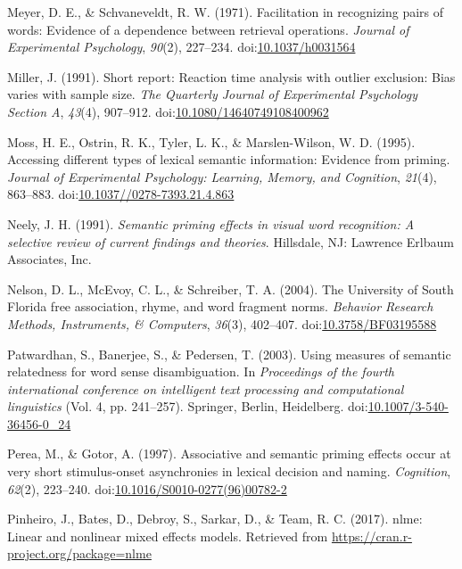 \documentclass[english,man]{apa6}
\theoremstyle{definition}
\theoremstyle{definition}
\theoremstyle{definition}
\theoremstyle{remark}
\begin{document}
\hypertarget{ref-Meyer1971}{}
Meyer, D. E., \& Schvaneveldt, R. W. (1971). Facilitation in recognizing
pairs of words: Evidence of a dependence between retrieval operations.
\emph{Journal of Experimental Psychology}, \emph{90}(2), 227--234.
doi:\href{https://doi.org/10.1037/h0031564}{10.1037/h0031564}

\hypertarget{ref-Miller1991}{}
Miller, J. (1991). Short report: Reaction time analysis with outlier
exclusion: Bias varies with sample size. \emph{The Quarterly Journal of
Experimental Psychology Section A}, \emph{43}(4), 907--912.
doi:\href{https://doi.org/10.1080/14640749108400962}{10.1080/14640749108400962}

\hypertarget{ref-Moss1995}{}
Moss, H. E., Ostrin, R. K., Tyler, L. K., \& Marslen-Wilson, W. D.
(1995). Accessing different types of lexical semantic information:
Evidence from priming. \emph{Journal of Experimental Psychology:
Learning, Memory, and Cognition}, \emph{21}(4), 863--883.
doi:\href{https://doi.org/10.1037//0278-7393.21.4.863}{10.1037//0278-7393.21.4.863}

\hypertarget{ref-Neely1991}{}
Neely, J. H. (1991). \emph{Semantic priming effects in visual word
recognition: A selective review of current findings and theories}.
Hillsdale, NJ: Lawrence Erlbaum Associates, Inc.

\hypertarget{ref-Nelson2004}{}
Nelson, D. L., McEvoy, C. L., \& Schreiber, T. A. (2004). The University
of South Florida free association, rhyme, and word fragment norms.
\emph{Behavior Research Methods, Instruments, \& Computers},
\emph{36}(3), 402--407.
doi:\href{https://doi.org/10.3758/BF03195588}{10.3758/BF03195588}

\hypertarget{ref-Patwardhan2003}{}
Patwardhan, S., Banerjee, S., \& Pedersen, T. (2003). Using measures of
semantic relatedness for word sense disambiguation. In \emph{Proceedings
of the fourth international conference on intelligent text processing
and computational linguistics} (Vol. 4, pp. 241--257). Springer, Berlin,
Heidelberg.
doi:\href{https://doi.org/10.1007/3-540-36456-0_24}{10.1007/3-540-36456-0\_24}

\hypertarget{ref-Perea1997}{}
Perea, M., \& Gotor, A. (1997). Associative and semantic priming effects
occur at very short stimulus-onset asynchronies in lexical decision and
naming. \emph{Cognition}, \emph{62}(2), 223--240.
doi:\href{https://doi.org/10.1016/S0010-0277(96)00782-2}{10.1016/S0010-0277(96)00782-2}

\hypertarget{ref-Pinheiro2017}{}
Pinheiro, J., Bates, D., Debroy, S., Sarkar, D., \& Team, R. C. (2017).
nlme: Linear and nonlinear mixed effects models. Retrieved from
\url{https://cran.r-project.org/package=nlme}
\end{document}

